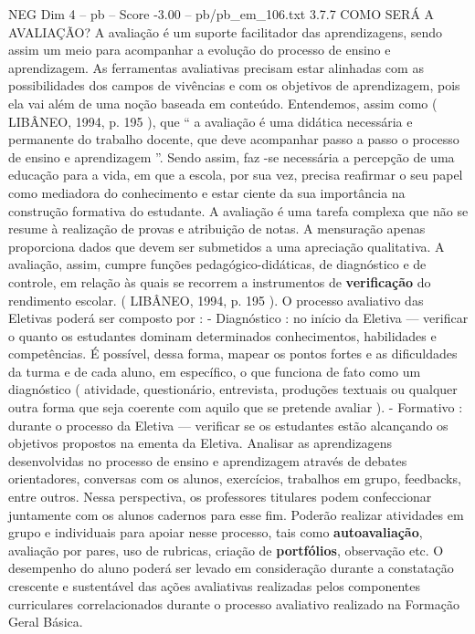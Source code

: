 \begin{textsample}{NEG Dim 4 – pb – Score -3.00 – pb/pb\_em\_106.txt}  \label{ex:f4_neg_023}
3.7.7 COMO SERÁ A AVALIAÇÃO?
A avaliação é um suporte facilitador das aprendizagens, sendo assim um meio para acompanhar a evolução do processo de ensino e aprendizagem.
As ferramentas avaliativas precisam estar alinhadas com as possibilidades dos campos de vivências e com os objetivos de aprendizagem, pois ela vai além de uma noção baseada em conteúdo.
Entendemos, assim como ( LIBÂNEO, 1994, p. 195 ), que “ a avaliação é uma didática necessária e permanente do trabalho docente, que deve acompanhar passo a passo o processo de ensino e aprendizagem ”.
Sendo assim, faz -se necessária a percepção de uma educação para a vida, em que a escola, por sua vez, precisa reafirmar o seu papel como mediadora do conhecimento e estar ciente da sua importância na construção formativa do estudante.
A avaliação é uma tarefa complexa que não se resume à realização de provas e atribuição de notas.
A mensuração apenas proporciona dados que devem ser submetidos a uma apreciação qualitativa.
A avaliação, assim, cumpre funções pedagógico-didáticas, de diagnóstico e de controle, em relação às quais se recorrem a instrumentos de \textbf{verificação} do rendimento escolar. ( LIBÂNEO, 1994, p. 195 ).
O processo avaliativo das Eletivas poderá ser composto por : - Diagnóstico : no início da Eletiva — verificar o quanto os estudantes dominam determinados conhecimentos, habilidades e competências.
É possível, dessa forma, mapear os pontos fortes e as dificuldades da turma e de cada aluno, em específico, o que funciona de fato como um diagnóstico ( atividade, questionário, entrevista, produções textuais ou qualquer outra forma que seja coerente com aquilo que se pretende avaliar ). - Formativo : durante o processo da Eletiva — verificar se os estudantes estão alcançando os objetivos propostos na ementa da Eletiva.
Analisar as aprendizagens desenvolvidas no processo de ensino e aprendizagem através de debates orientadores, conversas com os alunos, exercícios, trabalhos em grupo, feedbacks, entre outros.
Nessa perspectiva, os professores titulares podem confeccionar juntamente com os alunos cadernos para esse fim.
Poderão realizar atividades em grupo e individuais para apoiar nesse processo, tais como \textbf{autoavaliação}, avaliação por pares, uso de rubricas, criação de \textbf{portfólios}, observação etc.
O desempenho do aluno poderá ser levado em consideração durante a constatação crescente e sustentável das ações avaliativas realizadas pelos componentes curriculares correlacionados durante o processo avaliativo realizado na Formação Geral Básica.

\end{textsample}
